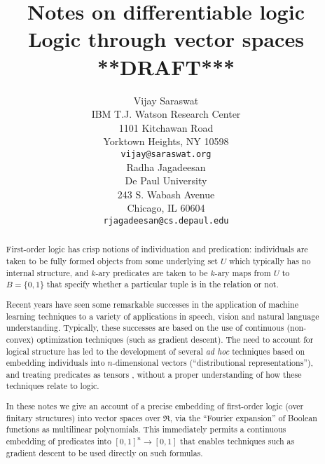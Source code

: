 \documentclass{article} %
\newcommand{\keywords}[1]{\par\addvspace\baselineskip
\noindent\keywordname\enspace\ignorespaces#1}
\begin{document}
%

\long{}
\def\mtimes{}
\def\LL#1{#1}
\title{Notes on differentiable logic \\
{\small Logic through vector spaces} \\
{\small ***DRAFT***}}

\author{Vijay Saraswat \\
IBM T.J. Watson Research Center\\
1101 Kitchawan Road\\
Yorktown Heights, NY 10598 \\
\texttt{vijay@saraswat.org} \\
\And
Radha Jagadeesan \\
De Paul University \\
243 S. Wabash Avenue \\
Chicago, IL 60604 \\
\texttt{rjagadeesan@cs.depaul.edu}
}

\newcommand{\fix}{\marginpar{FIX}}
\newcommand{\new}{\marginpar{NEW}}

\nipsfinalcopy %

\maketitle

\begin{abstract}
First-order logic has crisp notions of individuation and predication: individuals are taken  to be fully formed objects from some underlying set $U$ which typically has no internal structure, and $k$-ary predicates are taken to be $k$-ary maps from $U$ to $B=\{0,1\}$ that specify whether a particular tuple is in the relation or not. 

Recent years have seen some remarkable successes in the application of machine learning techniques to a variety of applications in speech, vision and natural language understanding. Typically, these successes are based on the use of continuous (non-convex) optimization techniques (such as gradient descent). The need to account for logical structure has led to the development of several {\em ad hoc} techniques based on embedding individuals into $n$-dimensional vectors (``distributional representations''), and treating predicates as tensors \cite{bishan-iclr15,rocktaschel-2015,coecke-2010,grefenstette-2013,order-embedding-kiros}, without a proper understanding of how these techniques relate to logic. 

In these notes we give an account of a precise embedding of first-order logic (over finitary structures) into vector spaces over $\Re$, via the ``Fourier expansion'' of Boolean functions as multilinear polynomials. This immediately permits a continuous embedding of predicates into $[0,1]^n \rightarrow [0,1]$ that enables techniques such as gradient descent to be used directly on such formulas.

\end{abstract}
\end{document}
